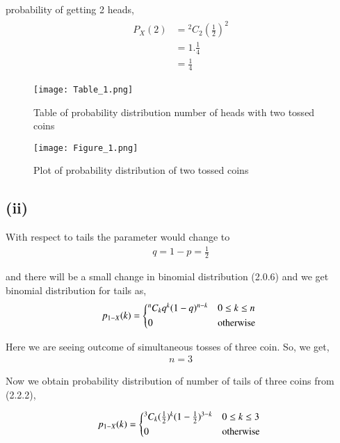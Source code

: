 \documentclass[journal,12pt,twocolumn]{IEEEtran}
\begin{document}
probability of getting 2 heads,
\begin{align}
    \begin{split}
    P_X(2) &= {^2C_2}(\frac{1}{2})^2\\
    &=1.\frac{1}{4}\\
    &=\frac{1}{4}
    \end{split}
\end{align}

\begin{figure}[h!]
    \centering
    \texttt{[image: Table\_1.png]}
    \caption{Table of probability distribution number of heads with two tossed coins}
    \label{fig:Table_1}
\end{figure}

\begin{figure}[h!]
    \centering
    \texttt{[image: Figure\_1.png]}
    \caption{Plot of probability distribution of two tossed coins}
    \label{fig:Two coins}
\end{figure}

\subsection{(ii)}

With respect to tails the parameter would change to 
\begin{align}
    q=1-p=\frac{1}{2}
\end{align}

and there will be a small change in binomial distribution (2.0.6) and we get binomial distribution for tails as,
\begin{align}
   p_{1-X}(k) =
  \begin{cases*}
    {^n C_k}q^{k}(1-q)^{n-k} & $0 \leq k \leq n$\\
      0 & otherwise
  \end{cases*}
\end{align}

Here we are seeing outcome of simultaneous tosses of three coin. So, we get,
\begin{align}
    n=3
\end{align}

Now we obtain probability distribution of number of tails of three coins from (2.2.2),

\begin{align*}
   p_{1-X}(k) =
  \begin{cases*}
    {^3 C_k}(\frac{1}{2})^{k}(1-\frac{1}{2})^{3-k} & $0 \leq k \leq 3$\\
    0 & otherwise
  \end{cases*}
\end{align*}
\end{document}
